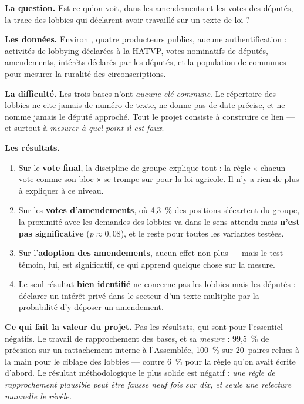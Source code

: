\documentclass[11pt,a4paper]{article}
\begin{document}
\begin{encadre}[L'essentiel]
\textbf{La question.} Est-ce qu'on voit, dans les amendements et les votes des députés,
la trace des lobbies qui déclarent avoir travaillé sur un texte de loi ?

\textbf{Les données.} Environ , quatre producteurs publics, aucune
authentification :  activités de lobbying déclarées à la HATVP,
 votes nominatifs de députés,  amendements,
 intérêts déclarés par les députés, et la population de
 communes pour mesurer la ruralité des circonscriptions.

\textbf{La difficulté.} Les trois bases n'ont \emph{aucune clé commune}. Le répertoire
des lobbies ne cite jamais de numéro de texte, ne donne pas de date précise, et ne nomme
jamais le député approché. Tout le projet consiste à construire ce lien --- et surtout à
\emph{mesurer à quel point il est faux}.

\textbf{Les résultats.}
\begin{enumerate}
\item Sur le \textbf{vote final}, la discipline de groupe explique tout : la règle
  « chacun vote comme son bloc » se trompe sur  pour la loi
  agricole. Il n'y a rien de plus à expliquer à ce niveau.
\item Sur les \textbf{votes d'amendements}, où 4,3~\% des positions s'écartent du groupe,
  la proximité avec les demandes des lobbies va dans le sens attendu mais
  \textbf{n'est pas significative} ($p \approx 0{,}08$), et le reste pour toutes les
  variantes testées.
\item Sur l'\textbf{adoption des amendements}, aucun effet non plus --- mais le test
  témoin, lui, est significatif, ce qui apprend quelque chose sur la mesure.
\item Le seul résultat \textbf{bien identifié} ne concerne pas les lobbies mais les
  députés : déclarer un intérêt privé dans le secteur d'un texte multiplie par
   la probabilité d'y déposer un amendement.
\end{enumerate}

\textbf{Ce qui fait la valeur du projet.} Pas les résultats, qui sont pour l'essentiel
négatifs. Le travail de rapprochement des bases, et sa \emph{mesure} : 99,5~\% de
précision sur un rattachement interne à l'Assemblée, 100~\% sur 20~paires relues à la
main pour le ciblage des lobbies --- contre 6~\% pour la règle qu'on avait écrite
d'abord. Le résultat méthodologique le plus solide est négatif :
\emph{une règle de rapprochement plausible peut être fausse neuf fois sur dix, et seule
une relecture manuelle le révèle.}
\end{encadre}
\end{document}
